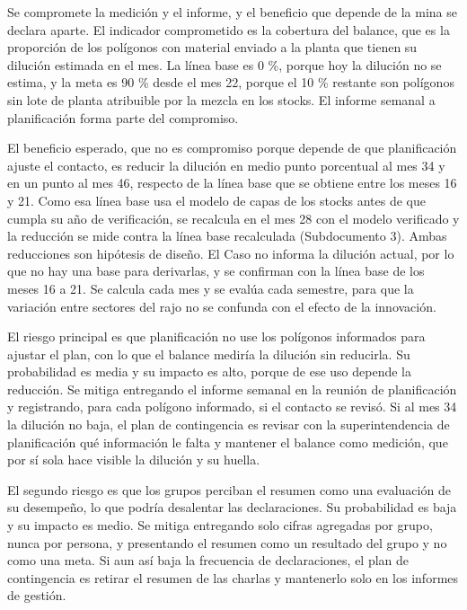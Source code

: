 \documentclass[subdoc]{../../comun/overfore}
\begin{document}
Se compromete la medición y el informe, y el beneficio que depende de la mina se declara aparte. El indicador comprometido es la cobertura del balance, que es la proporción de los polígonos con material enviado a la planta que tienen su dilución estimada en el mes. La línea base es 0 \%, porque hoy la dilución no se estima, y la meta es 90 \% desde el mes 22, porque el 10 \% restante son polígonos sin lote de planta atribuible por la mezcla en los stocks. El informe semanal a planificación forma parte del compromiso.

El beneficio esperado, que no es compromiso porque depende de que planificación ajuste el contacto, es reducir la dilución en medio punto porcentual al mes 34 y en un punto al mes 46, respecto de la línea base que se obtiene entre los meses 16 y 21. Como esa línea base usa el modelo de capas de los stocks antes de que cumpla su año de verificación, se recalcula en el mes 28 con el modelo verificado y la reducción se mide contra la línea base recalculada (Subdocumento 3). Ambas reducciones son hipótesis de diseño. El Caso no informa la dilución actual, por lo que no hay una base para derivarlas, y se confirman con la línea base de los meses 16 a 21. Se calcula cada mes y se evalúa cada semestre, para que la variación entre sectores del rajo no se confunda con el efecto de la innovación.

El riesgo principal es que planificación no use los polígonos informados para ajustar el plan, con lo que el balance mediría la dilución sin reducirla. Su probabilidad es media y su impacto es alto, porque de ese uso depende la reducción. Se mitiga entregando el informe semanal en la reunión de planificación y registrando, para cada polígono informado, si el contacto se revisó. Si al mes 34 la dilución no baja, el plan de contingencia es revisar con la superintendencia de planificación qué información le falta y mantener el balance como medición, que por sí sola hace visible la dilución y su huella.

El segundo riesgo es que los grupos perciban el resumen como una evaluación de su desempeño, lo que podría desalentar las declaraciones. Su probabilidad es baja y su impacto es medio. Se mitiga entregando solo cifras agregadas por grupo, nunca por persona, y presentando el resumen como un resultado del grupo y no como una meta. Si aun así baja la frecuencia de declaraciones, el plan de contingencia es retirar el resumen de las charlas y mantenerlo solo en los informes de gestión.
\end{document}
